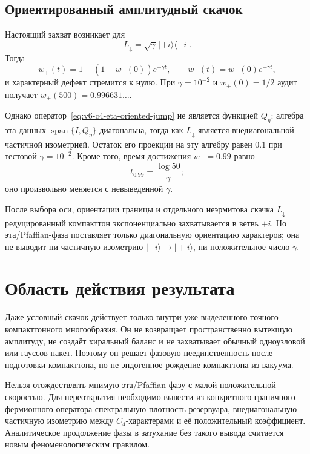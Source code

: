 \subsection{Ориентированный амплитудный скачок}

Настоящий захват возникает для
\begin{equation}
 L_\downarrow=\sqrt\gamma\,|+i\rangle\langle-i|.
 \label{eq:v6-c4-eta-oriented-jump}
\end{equation}
Тогда
\begin{equation}
 w_+(t)=1-(1-w_+(0))e^{-\gamma t},
 \qquad
 w_-(t)=w_-(0)e^{-\gamma t},
 \label{eq:v6-c4-eta-capture-law}
\end{equation}
и характерный дефект стремится к нулю. При $\gamma=10^{-2}$ и
$w_+(0)=1/2$ аудит получает $w_+(500)=0.996631\ldots$.

Однако оператор~\eqref{eq:v6-c4-eta-oriented-jump} не является функцией
$Q_\eta$: алгебра эта-данных
$\operatorname{span}\{I,Q_\eta\}$ диагональна, тогда как
$L_\downarrow$ является внедиагональной частичной изометрией. Остаток его
проекции на эту алгебру равен $0.1$ при тестовой
$\gamma=10^{-2}$. Кроме того, время достижения $w_+=0.99$ равно
\begin{equation}
 t_{0.99}=\frac{\log50}{\gamma};
\end{equation}
оно произвольно меняется с невыведенной $\gamma$.

\begin{proposition}
После выбора оси, ориентации границы и отдельного неэрмитова скачка
$L_\downarrow$ редуцированный компакттон экспоненциально захватывается в
ветвь $+i$. Но эта/Pfaffian-фаза поставляет только диагональную ориентацию
характеров; она не выводит ни частичную изометрию
$|-i\rangle\to|+i\rangle$, ни положительное число $\gamma$.
\end{proposition}

\section{Область действия результата}

Даже условный скачок действует только внутри уже выделенного точного
компакттонного многообразия. Он не возвращает пространственно вытекшую
амплитуду, не создаёт хиральный баланс и не захватывает обычный
одноузловой или гауссов пакет. Поэтому он решает фазовую неединственность
после подготовки компакттона, но не эндогенное рождение компакттона из
вакуума.

\begin{nogocriterion}
Нельзя отождествлять мнимую эта/Pfaffian-фазу с малой положительной
скоростью. Для переоткрытия необходимо вывести из конкретного
граничного фермионного оператора спектральную плотность резервуара,
внедиагональную частичную изометрию между $C_4$-характерами и её
положительный коэффициент. Аналитическое продолжение фазы в затухание без
такого вывода считается новым феноменологическим правилом.
\end{nogocriterion}

